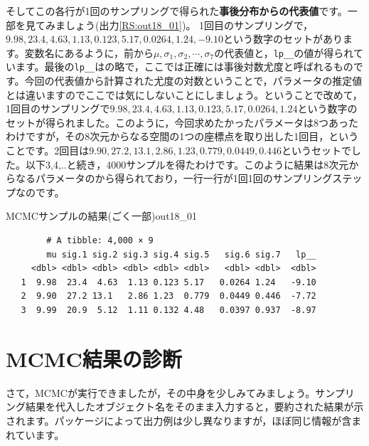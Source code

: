 \documentclass{ltjsbook}
\begin{document}
そしてこの各行が1回のサンプリングで得られた\textbf{事後分布からの代表値}です。一部を見てみましょう(出力\ref{RS:out18_01})。
1回目のサンプリングで，$9.98,23.4,4.63,1.13,0.123,5.17,0.0264,1.24,-9.10$という数字のセットがあります。変数名にあるように，前から$\mu, \sigma_1,\sigma_2,\cdots,\sigma_7$の代表値と，\verb|lp__|の値が得られています。最後の\verb|lp__|はの略で，ここでは正確には事後対数尤度と呼ばれるものです。今回の代表値から計算された尤度の対数ということで，パラメータの推定値とは違いますのでここでは気にしないことにしましょう。ということで改めて，1回目のサンプリングで$9.98,23.4,4.63,1.13,0.123,5.17,0.0264,1.24$という数字のセットが得られました。このように，今回求めたかったパラメータは8つあったわけですが，その8次元からなる空間の1つの座標点を取り出した1回目，ということです。2回目は$9.90,27.2,13.1,2.86,1.23,0.779,0.0449,0.446$というセットでした。以下3,4,..と続き，4000サンプルを得たわけです。このように結果は8次元からなるパラメータのから得られており，一行一行が1回1回のサンプリングステップなのです。

\begin{Rscreen}{MCMCサンプルの結果(ごく一部)}{out18_01}
    \begin{verbatim}
        # A tibble: 4,000 × 9
        mu sig.1 sig.2 sig.3 sig.4 sig.5   sig.6 sig.7   lp__
     <dbl> <dbl> <dbl> <dbl> <dbl> <dbl>   <dbl> <dbl>  <dbl>
   1  9.98  23.4  4.63  1.13 0.123 5.17   0.0264 1.24   -9.10
   2  9.90  27.2 13.1   2.86 1.23  0.779  0.0449 0.446  -7.72
   3  9.99  20.9  5.12  1.11 0.132 4.48   0.0397 0.937  -8.97
\end{verbatim}
\end{Rscreen}

\section{MCMC結果の診断}
さて，MCMCが実行できましたが，その中身を少しみてみましょう。サンプリング結果を代入したオブジェクト名をそのまま入力すると，要約された結果が示されます。パッケージによって出力例は少し異なりますが，ほぼ同じ情報が含まれています。
\end{document}
